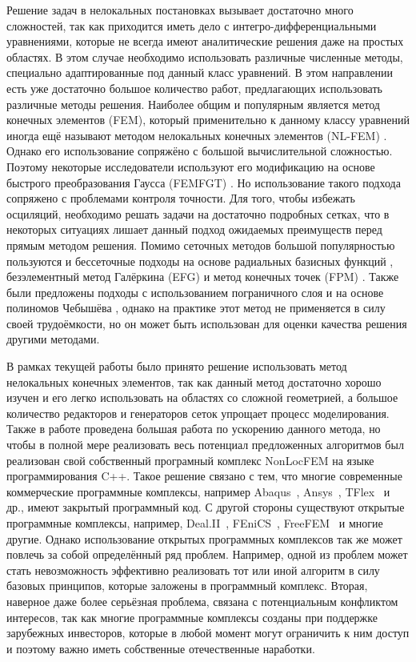 \ifsynopsis
\else
Решение задач в нелокальных постановках вызывает достаточно много сложностей, так как приходится иметь дело с интегро-дифференциальными уравнениями, которые не всегда имеют аналитические решения даже на простых областях. В этом случае необходимо использовать различные численные методы, специально адаптированные под данный класс уравнений. В этом направлении есть уже достаточно большое количество работ, предлагающих использовать различные методы решения. Наиболее общим и популярным является метод конечных элементов (FEM), который применительно к данному классу уравнений иногда ещё называют методом нелокальных конечных элементов (NL-FEM) \cite{Polizzotto2, Pisano1}. Однако его использование сопряжёно с большой вычислительной сложностью. Поэтому некоторые исследователи используют его модификацию на основе быстрого преобразования Гаусса (FEMFGT) \cite{FastGaussTransform}. Но использование такого подхода сопряжено с проблемами контроля точности. Для того, чтобы избежать осциляций, необходимо решать задачи на достаточно подробных сетках, что в некоторых ситуациях лишает данный подход ожидаемых преимуществ перед прямым методом решения. Помимо сеточных методов большой популярностью пользуются и бессеточные подходы на основе радиальных базисных функций \cite{RadialBasis}, безэлементный метод Галёркина (EFG) и метод конечных точек (FPM) \cite{MeshFree}. Также были предложены подходы с использованием пограничного слоя \cite{BondaryLayer} и на основе полиномов Чебышёва \cite{ChebPolynom}, однако на практике этот метод не применяется в силу своей трудоёмкости, но он может быть использован для оценки качества решения другими методами.
\fi

\ifsynopsis
\else
В рамках текущей работы было принято решение использовать метод нелокальных конечных элементов, так как данный метод достаточно хорошо изучен и его легко использовать на областях со сложной геометрией, а большое количество редакторов и генераторов сеток упрощает процесс моделирования. Также в работе проведена большая работа по ускорению данного метода, но чтобы в полной мере реализовать весь потенциал предложенных алгоритмов был реализован свой собственный програмный комплекс NonLocFEM \cite{NonLocFEM} на языке программирования C++. Такое решение связано с тем, что многие современные коммерческие программные комплексы, например Abaqus~\cite{Abaqus}, Ansys~\cite{Ansys}, TFlex~\cite{TFlex} и др., имеют закрытый программный код. С другой стороны существуют открытые программные комплексы, например, Deal.II~\cite{DealII}, FEniCS~\cite{FEniCS}, FreeFEM~\cite{FreeFEM} и многие другие. Однако использование открытых программных комплексов так же может повлечь за собой определённый ряд проблем. Например, одной из проблем может стать невозможность эффективно реализовать тот или иной алгоритм в силу базовых принципов, которые заложены в программный комплекс. Вторая, наверное даже более серьёзная проблема, связана с потенциальным конфликтом интересов, так как многие программные комплексы созданы при поддержке зарубежных инвесторов, которые в любой момент могут ограничить к ним доступ и поэтому важно иметь собственные отечественные наработки.
\fi

